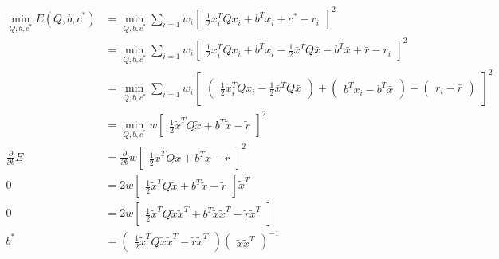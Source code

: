 \begin{align*}
\underset{Q,b,c^*}{\operatorname{min}} E(Q,b,c^*) &=
\underset{Q,b,c^*}{\operatorname{min}} \sum_{i=1}w_i \begin{bmatrix} \frac{1}{2}x_i^TQx_i + b^Tx_i + c^* - r_i \end{bmatrix}^2 \\
 &= \underset{Q,b,c^*}{\operatorname{min}} \sum_{i=1}w_i \begin{bmatrix} \frac{1}{2}x_i^TQx_i + b^Tx_i - \frac{1}{2} \bar{x}^TQ\bar{x} - b^T\bar{x} + \bar{r} - r_i \end{bmatrix}^2 \\
&= \underset{Q,b,c^*}{\operatorname{min}} \sum_{i=1}w_i \begin{bmatrix} \begin{pmatrix} \frac{1}{2}x_i^TQx_i - \frac{1}{2} \bar{x}^TQ\bar{x} \end{pmatrix} + \begin{pmatrix} b^Tx_i -  b^T\bar{x} \end{pmatrix} - \begin{pmatrix} r_i - \bar{r} \end{pmatrix} \end{bmatrix}^2 \\
&= \underset{Q,b,c^*}{\operatorname{min}} w \begin{bmatrix} \frac{1}{2}\tilde{x}^TQ\tilde{x} + b^T\tilde{x} - \tilde{r} \end{bmatrix}^2 \\
\frac{\partial}{\partial b} E &= \frac{\partial}{\partial b}  w \begin{bmatrix} \frac{1}{2}\tilde{x}^TQ\tilde{x} + b^T\tilde{x} - \tilde{r} \end{bmatrix}^2 \\
0 &= 2 w \begin{bmatrix} \frac{1}{2}\tilde{x}^TQ\tilde{x} + b^T\tilde{x} - \tilde{r} \end{bmatrix} \tilde{x}^T \\
0 &= 2w \begin{bmatrix} \frac{1}{2}\tilde{x}^TQ\tilde{x}\tilde{x}^T + b^T\tilde{x}\tilde{x}^T - \tilde{r}\tilde{x}^T \end{bmatrix} \\
b^* &= \begin{pmatrix} \frac{1}{2}\tilde{x}^TQ\tilde{x}\tilde{x}^T - \tilde{r}\tilde{x}^T \end{pmatrix}\begin{pmatrix} \tilde{x}\tilde{x}^T \end{pmatrix}^{-1} \\
\end{align*}

